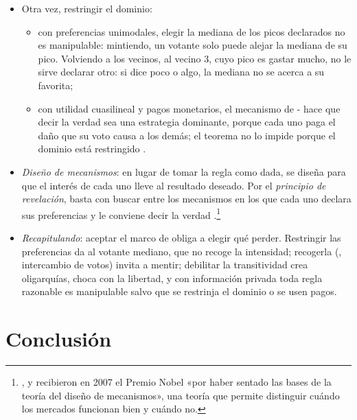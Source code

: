 \documentclass[11pt]{article}
\begin{document}
\begin{itemize}
\item Otra vez, restringir el dominio:
  \begin{itemize}
  \item con preferencias unimodales, elegir la mediana de los picos declarados no es manipulable: mintiendo, un votante solo puede alejar la mediana de su pico\nocite{Moulin1980Strategy}. Volviendo a los vecinos, al vecino 3, cuyo pico es gastar mucho, no le sirve declarar otro: si dice poco o algo, la mediana no se acerca a su favorita;
  \item con utilidad cuasilineal y pagos monetarios, el mecanismo de - hace que decir la verdad sea una estrategia dominante, porque cada uno paga el daño que su voto causa a los demás\nocite{Clarke1971Multipart,Groves1973Incentives}; el teorema no lo impide porque el dominio está restringido  .
  \end{itemize}
\item \emph{Diseño de mecanismos}: en lugar de tomar la regla como dada, se diseña para que el interés de cada uno lleve al resultado deseado. Por el \emph{principio de revelación}\nocite{Gibbard1973Manipulation,Myerson1979Incentive}, basta con buscar entre los mecanismos en los que cada uno declara sus preferencias y le conviene decir la verdad .\footnote{,  y  recibieron en 2007 el Premio Nobel «por haber sentado las bases de la teoría del diseño de mecanismos»\nocite{Nobel2007HurwiczMaskinMyerson}, una teoría que permite distinguir cuándo los mercados funcionan bien y cuándo no\nocite{Nobel2007Prensa}.}
\end{itemize}

\begin{itemize}
\item \emph{Recapitulando}: aceptar el marco de  obliga a elegir qué perder. Restringir las preferencias da al votante mediano, que no recoge la intensidad; recogerla (, intercambio de votos) invita a mentir; debilitar la transitividad crea oligarquías,  choca con la libertad, y con información privada toda regla razonable es manipulable salvo que se restrinja el dominio o se usen pagos.
\end{itemize}


\section*{Conclusión}
\end{document}
